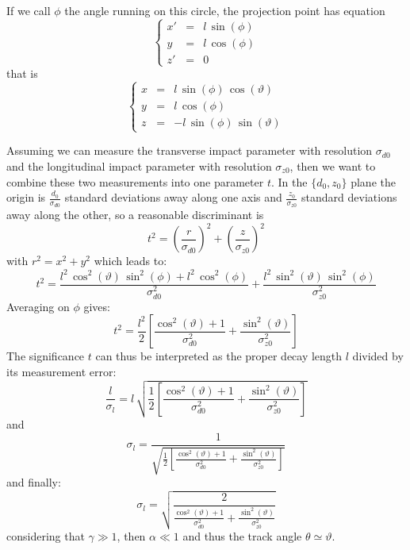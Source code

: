 \documentclass[10pt,a4paper]{article}
\begin{document}
If we call $\phi$ the angle running on this circle, the projection point has equation
\begin{equation}
\left \{
\begin{array}{rcl}
x' & = & l\,\sin(\phi) \\
y  & = & l\,\cos(\phi) \\
z '& = & 0
\end{array}
\right .
\end{equation}
that is
\begin{equation}
\left \{
\begin{array}{rcl}
x & = &  l\,\sin(\phi)\,\cos(\vartheta) \\
y & = &  l\,\cos(\phi) \\
z & = & -l\,\sin(\phi)\,\sin(\vartheta)
\end{array}
\right .
\end{equation}

Assuming we can measure the transverse impact parameter with
resolution $\sigma_{d0}$ and the longitudinal impact parameter with
resolution $\sigma_{z0}$, then we want to combine these two
measurements into one parameter $t$. In the $\{d_0, z_0\}$ plane the
origin is $\frac{d_0}{\sigma_{d0}}$ standard deviations away along one
axis and $\frac{z_0}{\sigma_{z0}}$ standard deviations away along the
other, so a reasonable discriminant is
\begin{equation}
t^2 = \left ( \frac {r} {\sigma_{d0}} \right )^2 + 
              \left ( \frac {z} {\sigma_{z0}} \right )^2
\end{equation}
with $r^2=x^2+y^2$ which leads to:
\begin{equation}
t^2 = \frac {l^2\,\cos^2(\vartheta)\,\sin^2(\phi) + l^2\,\cos^2(\phi)} {\sigma_{d0}^2} + 
    \frac {l^2\,\sin^2(\vartheta)\,\sin^2(\phi)} {\sigma_{z0}^2}
\end{equation}
Averaging on $\phi$ gives:
\begin{equation}
  t^2 = \frac {l^2} {2} \left [ \frac {\cos^2(\vartheta) + 1 } {\sigma_{d0}^2} + 
        \frac {\sin^2(\vartheta)} {\sigma_{z0}^2} \right ]
\end{equation}
The significance $t$ can thus be interpreted as the proper decay
length $l$ divided by its measurement error:
\begin{equation}
\frac {l} {\sigma_l} = l \, \sqrt{ \frac 1 2 \left [ \frac {\cos^2(\vartheta) + 1 } {\sigma_{d0}^2} + 
                                   \frac {\sin^2(\vartheta)} {\sigma_{z0}^2} \right ] }
\end{equation}
and 
\begin{equation}
\sigma_l = \frac 1 { \sqrt{ \frac 1 2 \left [ \frac {\cos^2(\vartheta) + 1 } {\sigma_{d0}^2} + 
                                   \frac {\sin^2(\vartheta)} {\sigma_{z0}^2} \right ] } }
\end{equation}
and finally:
\begin{equation}
\sigma_l = \sqrt{ \frac 2 {  \frac {\cos^2(\vartheta) + 1 } {\sigma_{d0}^2} + 
                                   \frac {\sin^2(\vartheta)} {\sigma_{z0}^2} } }
\end{equation}
considering that $\gamma \gg 1$, then $\alpha \ll 1$ and thus the track angle $\theta \simeq \vartheta$.
\end{document}
